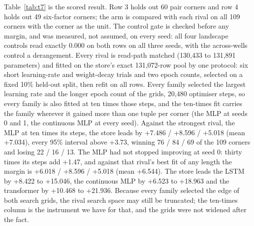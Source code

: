 \documentclass{article} %
\begin{document}
Table~\ref{tab:t7} is the scored result. Row 3 holds out 60 pair corners and row 4 holds out
49 six-factor corners; the arm is compared with each rival on all 109 corners with the corner
as the unit. %
The control gate is checked before any margin, and was measured, not assumed, on every seed:
all four landscape controls read exactly 0.000 on both rows on all three seeds, with the
across-wells control a derangement. %
Every rival is read-path matched (130,433 to 131,891 parameters) and fitted on the store's exact
131,072-row pool by one protocol: six short learning-rate and weight-decay trials and two epoch
counts, selected on a fixed 10\% held-out split, then refit on all rows. Every family selected the
largest learning rate and the longer epoch count of the grids, 20,480 optimiser steps, so every
family is also fitted at ten times those steps, and the ten-times fit carries the family wherever
it gained more than one tuple per corner (the MLP at seeds 0 and 1, the continuous MLP at every
seed). Against the strongest rival, the MLP at ten times its steps, the store leads by +7.486 /
+8.596 / +5.018 (mean +7.034), every 95\% interval above +3.73, winning 76 / 84 / 69 of the 109
corners and losing 22 / 16 / 13. The MLP had not stopped improving at seed 0: thirty times its steps
add +1.47, and against that rival's best fit of any length the margin is +6.018 / +8.596 / +5.018
(mean +6.544). The store leads the LSTM by +8.422 to +15.046, the continuous MLP by +6.523 to +18.963
and the transformer by +10.468 to +21.936. Because every family selected the edge of both search
grids, the rival search space may still be truncated; the ten-times column is the instrument we
have for that, and the grids were not widened after the fact.
\end{document}
